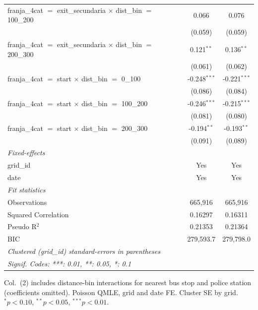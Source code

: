 \begin{tabular}{lcc}
   franja\_4cat $=$ exit\_secundaria $\times$ dist\_bin $=$ 100\_200      & 0.066          & 0.076\\   
                                                                          & (0.059)        & (0.059)\\   
   franja\_4cat $=$ exit\_secundaria $\times$ dist\_bin $=$ 200\_300      & 0.121$^{**}$   & 0.136$^{**}$\\   
                                                                          & (0.061)        & (0.062)\\   
   franja\_4cat $=$ start $\times$ dist\_bin $=$ 0\_100                   & -0.248$^{***}$ & -0.221$^{***}$\\   
                                                                          & (0.086)        & (0.084)\\   
   franja\_4cat $=$ start $\times$ dist\_bin $=$ 100\_200                 & -0.246$^{***}$ & -0.215$^{***}$\\   
                                                                          & (0.081)        & (0.080)\\   
   franja\_4cat $=$ start $\times$ dist\_bin $=$ 200\_300                 & -0.194$^{**}$  & -0.193$^{**}$\\   
                                                                          & (0.091)        & (0.089)\\   
   \midrule
   \emph{Fixed-effects}\\
   grid\_id                                                               & Yes            & Yes\\  
   date                                                                   & Yes            & Yes\\  
   \midrule
   \emph{Fit statistics}\\
   Observations                                                           & 665,916        & 665,916\\  
   Squared Correlation                                                    & 0.16297        & 0.16311\\  
   Pseudo R$^2$                                                           & 0.21353        & 0.21364\\  
   BIC                                                                    & 279,593.7      & 279,798.0\\  
   \midrule \midrule
   \multicolumn{3}{l}{\emph{Clustered (grid\_id) standard-errors in parentheses}}\\
   \multicolumn{3}{l}{\emph{Signif. Codes: ***: 0.01, **: 0.05, *: 0.1}}\\
\end{tabular}
 
\par \raggedright 
Col.~(2) includes distance-bin interactions for nearest bus stop and police station (coefficients omitted). Poisson QMLE, grid and date FE. Cluster SE by grid. $^{*}p<0.10$, $^{**}p<0.05$, $^{***}p<0.01$.
\par\endgroup


